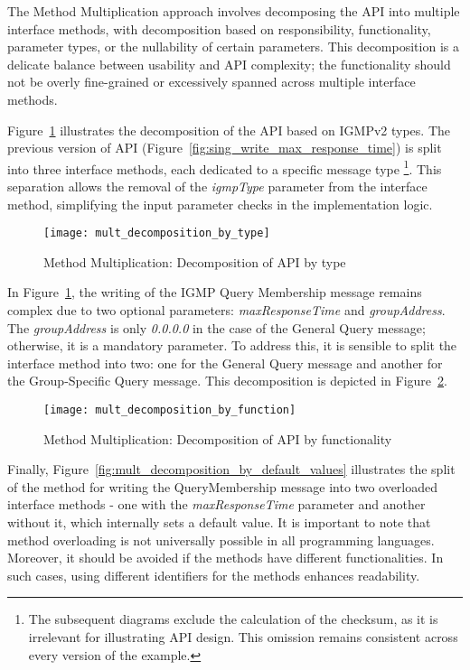 The Method Multiplication approach involves decomposing the API into multiple interface methods,
with decomposition based on responsibility, functionality, parameter types, or the nullability of certain parameters.
This decomposition is a delicate balance between usability and API complexity; the functionality should not be overly
fine-grained or excessively spanned across multiple interface methods.

Figure~\ref{fig:mult_decomposition_by_type} illustrates the decomposition of the API based on IGMPv2 types.
The previous version of API (Figure~\ref{fig:sing_write_max_response_time}) is split into three interface methods,
each dedicated to a specific message type
\footnote{
    The subsequent diagrams exclude the calculation of the checksum, as it is irrelevant for illustrating API design.
    This omission remains consistent across every version of the example.
}.
This separation allows the removal of the \textit{igmpType} parameter from the interface method,
simplifying the input parameter checks in the implementation logic.

\begin{figure}[!htb]
    \centering
    \texttt{[image: mult\_decomposition\_by\_type]}
    \caption{Method Multiplication: Decomposition of API by type}
    \label{fig:mult_decomposition_by_type}
\end{figure}

In Figure~\ref{fig:mult_decomposition_by_type}, the writing of the IGMP Query Membership message remains complex due
to two optional parameters: \textit{maxResponseTime} and \textit{groupAddress}.
The \textit{groupAddress} is only \textit{0.0.0.0} in the case of the General Query message; otherwise,
it is a mandatory parameter.
To address this, it is sensible to split the interface method into two: one for the General Query message and another
for the Group-Specific Query message.
This decomposition is depicted in Figure~\ref{fig:mult_decomposition_by_function}.

\begin{figure}[!htb]
    \centering
    \texttt{[image: mult\_decomposition\_by\_function]}
    \caption{Method Multiplication: Decomposition of API by functionality}
    \label{fig:mult_decomposition_by_function}
\end{figure}

Finally, Figure~\ref{fig:mult_decomposition_by_default_values} illustrates the split of the method for writing
the QueryMembership message into two overloaded interface methods - one with the \textit{maxResponseTime} parameter
and another without it, which internally sets a default value.
It is important to note that method overloading is not universally possible in all programming languages.
Moreover, it should be avoided if the methods have different functionalities.
In such cases, using different identifiers for the methods enhances readability.

